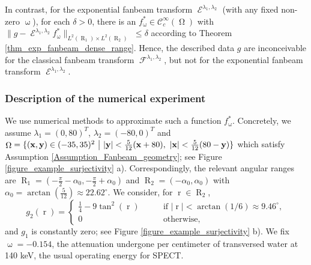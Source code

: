 \documentclass[12pt]{article}
\DeclareMathOperator{\Fanbeam}{\mathcal{F}}
\DeclareMathOperator{\ExpoFanbeam}{\mathcal{E}}
\DeclareMathOperator{\rayvariable}{r}
\DeclareMathOperator{\raygroundset}{R}
\DeclareMathOperator{\attenuation}{\omega}
\DeclareMathOperator{\imgdom}{{\Omega}}
\begin{document}
 
In contrast, for the exponential fanbeam transform $\ExpoFanbeam^{\lambda_1,\lambda_2}$ (with any fixed non-zero $\attenuation$), for each $\delta>0$, there is an $f_{\attenuation}^*\in \mathcal{C}^\infty_c(\imgdom)$ with $\|g-\ExpoFanbeam^{\lambda_1,\lambda_2}f_{\attenuation}^*\|_{L^2(\raygroundset_1)\times L^2(\raygroundset_2)}$ $\leq \delta$  according to Theorem \ref{thm_exp_fanbeam_dense_range}. 
Hence, the described data $g$ are inconceivable for the classical fanbeam transform $\Fanbeam^{\lambda_1,\lambda_2}$, but not for the exponential fanbeam transform $\ExpoFanbeam^{\lambda_1,\lambda_2}$.



\subsubsection*{Description of the numerical experiment}
We use numerical methods to approximate such a function $f_{\attenuation}^*$. %
Concretely, we assume $\lambda_1=(0,80)^T$, $\lambda_2=(-80,0)^T$ and $\imgdom=\{(\bold x, \bold y)\in (-35,35)^2\ \big|\   |\bold y|<\frac 5 {12}( \bold x+80), \ |\bold x|< \frac 5 {12} (80-\bold y)\}$ which satisfy Assumption \ref{Assumption_Fanbeam_geometry}; see Figure \ref{figure_example_surjectivity} a). 
Correspondingly, the relevant angular ranges are  $\raygroundset_1 = (- \frac {\pi} {2}-\alpha_0, - \frac {\pi} {2}+\alpha_0)$ and $\raygroundset_2 = (-\alpha_0,\alpha_0)$ with $\alpha_0 = \arctan\left ( \frac{5}{12}\right)\approx 22.62^\circ$.
We consider, for $\rayvariable \in \raygroundset_2$,
\begin{equation}\label{equ_fanbeam_numerics_definition_g2}
g_2(\rayvariable) = \begin{cases} \frac{1}{4}-9\tan ^2\left(\rayvariable\right) \qquad & \text{if }|\rayvariable|<\arctan(1/6)\approx 9.46^\circ ,
\\
0 & \text{otherwise},
\end{cases}
\end{equation}
and $g_1$ is constantly zero; see Figure \ref{figure_example_surjectivity} b).  We fix $\attenuation=-0.154$, the  attenuation undergone per centimeter of transversed water at 140 keV, the usual operating energy for SPECT.
\end{document}
